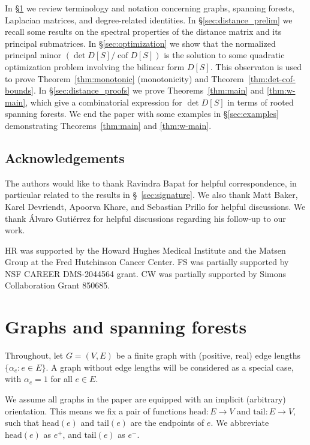 \documentclass[12pt]{amsart}
\theoremstyle{definition}
\DeclareMathOperator{\cof}{cof}
\begin{document}
In \S\ref{sec:graphs-matrices} we review terminology and notation concerning graphs, spanning forests, Laplacian matrices, and degree-related identities.
In \S\ref{sec:distance_prelim} we recall some results on the spectral properties of the distance matrix and its principal submatrices.
In \S\ref{sec:optimization} we show that the normalized principal minor $(\det D[S] / \cof D[S])$ is the solution to some quadratic optimization problem involving the bilinear form $D[S]$.
This observaton is used to prove
Theorem~\ref{thm:monotonic} (monotonicity) and Theorem~\ref{thm:det-cof-bounds}.
In \S\ref{sec:distance_proofs} we prove Theorems~\ref{thm:main} and \ref{thm:w-main}, which give a combinatorial expression for $\det D[S]$ in terms of rooted spanning forests.
We end the paper with some examples in \S\ref{sec:examples} demonstrating Theorems~\ref{thm:main} and \ref{thm:w-main}.


\subsection*{Acknowledgements}
The authors would like to thank Ravindra Bapat for helpful correspondence,
in particular related to the results in \S~\ref{sec:signature}. 
We also thank Matt Baker, Karel Devriendt, Apoorva Khare, and Sebastian Prillo for helpful discussions.
We thank \'{A}lvaro Guti\'{e}rrez for helpful discussions regarding his follow-up to our work.

 HR was supported by the Howard Hughes Medical Institute and the Matsen Group at the Fred Hutchinson Cancer Center. 
 FS was partially supported by NSF CAREER DMS-2044564 grant.
 CW was partially supported by Simons Collaboration Grant 850685.


\renewcommand*{\thethm}{\arabic{section}.\arabic{thm}}

\section{Graphs and spanning forests}
\label{sec:graphs-matrices}

Throughout, let $G = (V, E)$ be a finite graph with (positive, real) edge lengths $\{ \alpha_e \colon e \in E\}$. 
A graph without edge lengths will be considered as a special case, with $\alpha_e=1$ for all $e \in E$.

We assume all graphs in the paper are equipped with an implicit (arbitrary) orientation. This means we fix a pair of functions $\mathrm{head}\colon E \to V$ and $\mathrm{tail}\colon E \to V$, such that $\mathrm{head}(e)$ and $\mathrm{tail}(e)$ are the endpoints of $e$. We abbreviate $\mathrm{head}(e)$ as $e^+$, and $\mathrm{tail}(e)$ as $e^-$.
\end{document}
